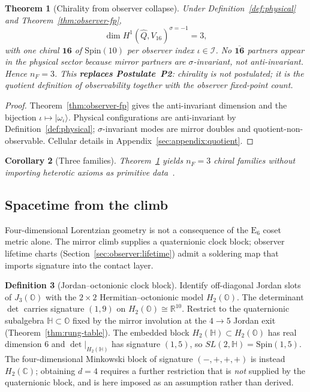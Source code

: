\documentclass[aps,prd,onecolumn,amsmath,amssymb,nofootinbib,11pt]{revtex4-2}
\numberwithin{equation}{section}
\theoremstyle{plain}
\newtheorem{theorem}{Theorem}[section]
\newtheorem{corollary}[theorem]{Corollary}
\theoremstyle{definition}
\newtheorem{definition}[theorem]{Definition}
\theoremstyle{remark}
\newcommand{\R}{\mathbb{R}}
\newcommand{\C}{\mathbb{C}}
\newcommand{\Quat}{\mathbb{H}}
\newcommand{\Oct}{\mathbb{O}}
\newcommand{\jalg}{J_3(\mathbb{O})}
\newcommand{\E}[1]{\mathrm{E}_{#1}}
\newcommand{\Spin}{\mathrm{Spin}}
\begin{document}
\begin{theorem}[Chirality from observer collapse]\label{thm:chirality-derived}
Under Definition~\ref{def:physical} and Theorem~\ref{thm:observer-fp},
\begin{equation}\label{eq:chirality-derived}
  \dim H^1(\hat Q,V_{16})^{\sigma=-1}=3,
\end{equation}
with one chiral $\mathbf{16}$ of $\Spin(10)$ per observer index
$\iota\in\mathcal{I}$. No $\overline{\mathbf{16}}$ partners appear in the
physical sector because mirror partners are $\sigma$-invariant, not
anti-invariant. Hence $n_F=3$. This \textbf{replaces Postulate~P2}: chirality
is not postulated; it is the quotient definition of observability together
with the observer fixed-point count.
\end{theorem}

\begin{proof}
Theorem~\ref{thm:observer-fp} gives the anti-invariant dimension and the
bijection $\iota\mapsto|\omega_\iota\rangle$. Physical configurations are
anti-invariant by Definition~\ref{def:physical}; $\sigma$-invariant modes are
mirror doubles and quotient-non-observable. Cellular details in
Appendix~\ref{sec:appendix:quotient}.
\end{proof}

\begin{corollary}[Three families]\label{thm:three-families}
Theorem~\ref{thm:chirality-derived} yields $n_F=3$ chiral families without
importing heterotic axioms as primitive data~\cite{Witten1985}.
\end{corollary}

\subsection{Spacetime from the climb}
\label{sec:physics:spacetime}

Four-dimensional Lorentzian geometry is not a consequence of the $\E{6}$
coset metric alone. The mirror climb supplies a quaternionic clock block;
observer lifetime charts (Section~\ref{sec:observer:lifetime}) admit a
soldering map that imports signature into the contact layer.

\begin{definition}[Jordan--octonionic clock block]\label{def:spacetime:H2O}
Identify off-diagonal Jordan slots of $\jalg$ with the $2\times2$
Hermitian--octonionic model $H_2(\Oct)$. The determinant $\det$ carries
signature $(1,9)$ on $H_2(\Oct)\cong\R^{10}$. Restrict to the quaternionic
subalgebra $\Quat\subset\Oct$ fixed by the mirror involution at the
$4\to5$ Jordan exit (Theorem~\ref{thm:rung-table}). The embedded block $H_2(\Quat)\subset H_2(\Oct)$ has real dimension $6$ and
$\det|_{H_2(\Quat)}$ has signature $(1,5)$, so $SL(2,\Quat)=\mathrm{Spin}(1,5)$. The
four-dimensional Minkowski block of signature $(-,+,+,+)$ is instead $H_2(\C)$; obtaining
$d=4$ requires a further restriction that is \emph{not} supplied by the quaternionic block,
and is here imposed as an assumption rather than derived.
\end{definition}
\end{document}

